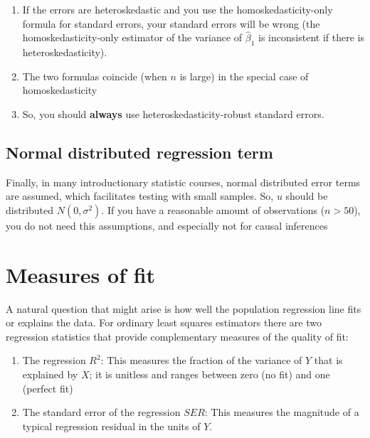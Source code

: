\documentclass[
]{book}
\providecommand{\tightlist}{%
  \setlength{\itemsep}{0pt}\setlength{\parskip}{0pt}}
\begin{document}
\begin{enumerate}
\def\labelenumi{\arabic{enumi}.}
\tightlist
\item
  If the errors are heteroskedastic and you use the homoskedasticity-only formula for standard errors, your standard errors will be wrong (the homoskedasticity-only estimator of the variance of \(\hat{\beta}_1\) is inconsistent if there is heteroskedasticity).
\item
  The two formulas coincide (when \(n\) is large) in the special case of homoskedasticity
\item
  So, you should \textbf{always} use heteroskedasticity-robust standard errors.
\end{enumerate}

\hypertarget{normal-distributed-regression-term}{%
\subsection{Normal distributed regression term}\label{normal-distributed-regression-term}}

Finally, in many introductionary statistic courses, normal distributed error terms are assumed, which facilitates testing with small samples. So, \(u\) should be distributed \(N(0,\sigma^2)\). If you have a reasonable amount of observations (\(n >50\)), you do not need this assumptions, and especially not for causal inferences

\hypertarget{measures-of-fit}{%
\section{Measures of fit}\label{measures-of-fit}}

A natural question that might arise is how well the population regression line fits or explains the data. For ordinary least squares estimators there are two regression statistics that provide complementary measures of the quality of fit:

\begin{enumerate}
\def\labelenumi{\arabic{enumi}.}
\tightlist
\item
  The regression \textbf{\(R^2\)}: This measures the fraction of the variance of \(Y\) that is explained by \(X\); it is unitless and ranges between zero (no fit) and one (perfect fit)
\item
  The standard error of the regression \textbf{\(SER\)}: This measures the magnitude of a typical regression residual in the units of \(Y\).
\end{enumerate}
\end{document}
